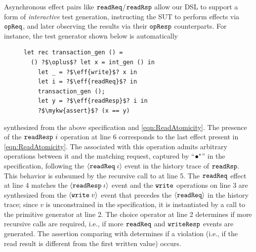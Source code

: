 Asynchronous effect pairs like $\boldsymbol{{\tt readReq}}$/$\boldsymbol{{\tt readRsp}}$ allow
our DSL to support a form of \emph{interactive} test generation,
instructing the SUT to perform effects via $\boldsymbol{{\tt opReq}}$, and later
observing the results via their $\boldsymbol{{\tt opResp}}$ counterparts.  For
instance, the test generator shown below is automatically
\begin{figure}
  \vspace{-10pt}
  \begin{verbatim}
let rec transaction_gen () =
  () ?$\oplus$? let x = int_gen () in
    let _ = ?$\eff{write}$? x in
    let i = ?$\eff{readReq}$? in
    transaction_gen ();
    let y = ?$\eff{readResp}$? i in
    ?$\mykw{assert}$? (x == y)
  \end{verbatim}
  \vspace{-10pt}
\end{figure}
synthesized from the above \tyName{} specification and
\ref{eqn:ReadAtomicity}.  The presence of the $\boldsymbol{{\tt readResp}}~i$
operation at line 6 corresponds to the last effect present in
\ref{eqn:ReadAtomicity}.  The \tyName{} associated with this operation
admits arbitrary operations between it and the matching request,
captured by ``${\bullet^*}$'' in the specification, following the
${\langle} {\boldsymbol{{\tt readReq}}\;{\iota}} {\rangle}$ event in the history trace of $\boldsymbol{{\tt readRsp}}$.
This behavior is subsumed by the recursive call to
 at line 5.  The $\boldsymbol{{\tt readReq}}$ effect at line
4 matches the ${\langle} {\boldsymbol{{\tt readResp}}\;{\iota}} {\rangle}$ event and the $\boldsymbol{{\tt write}}$
operations on line 3 are synthesized from the ${\langle} {\boldsymbol{{\tt write}}\;{v}} {\rangle}$ event
that precedes the $\mbox{$\langle\boldsymbol{{\tt readReq}}\rangle$}$ in the history trace; since $v$
is unconstrained in the specification, it is instantiated by a call
to the  primitive generator at line 2.  The
choice operator at line 2 determines if more recursive calls are
required, i.e., if more $\boldsymbol{{\tt readReq}}$ and $\boldsymbol{{\tt writeResp}}$ events
are generated.  The assertion comparing  with 
determines if a violation (i.e., if the read result is different from
the first written value) occurs.

